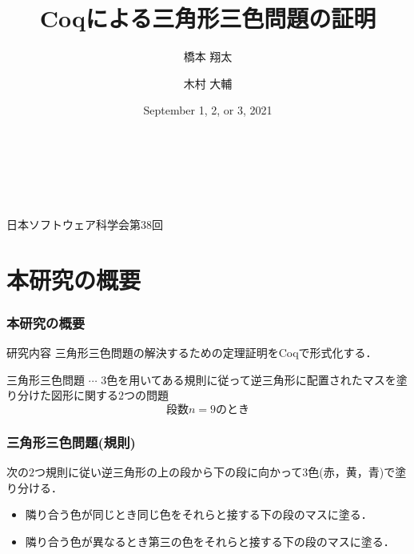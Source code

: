 \documentclass[dvipdfmx,cjk]{beamer}
\begin{document}
\title[Coqによる三角形三色問題の証明]{Coqによる三角形三色問題の証明} 
\author{橋本 翔太 \and 木村 大輔 }　%
\date{September 1, 2, or 3, 2021}　%

\begin{frame}
  \titlepage
  \begin{center}
    {\footnotesize{日本ソフトウェア科学会第$38$回}}
  \end{center} 
\end{frame}

\begin{frame}
\tableofcontents
\end{frame}

\section{本研究の概要}

\begin{frame}
  \frametitle{本研究の概要}
  \begin{block}{研究内容}
    三角形三色問題の解決するための定理証明をCoqで形式化する．
  \end{block}

  \vspace{10pt}
  三角形三色問題 $\cdots$ $3$色を用いてある規則に従って逆三角形に配置されたマスを塗り分けた図形に関する$2$つの問題
  \[
  
  \text{段数}n=9\text{のとき}
  \]
\end{frame}

\begin{frame}
  \frametitle{三角形三色問題(規則)}
  次の$2$つ規則に従い逆三角形の上の段から下の段に向かって$3$色(赤，黄，青)で塗り分ける．

  \vspace{10pt}
  \begin{itemize}
  \item
    隣り合う色が同じとき同じ色をそれらと接する下の段のマスに塗る．
    \[
    
    \]
  \item
    隣り合う色が異なるとき第三の色をそれらと接する下の段のマスに塗る．
    \[
    
    \]
  \end{itemize}
\end{frame}
\end{document}
